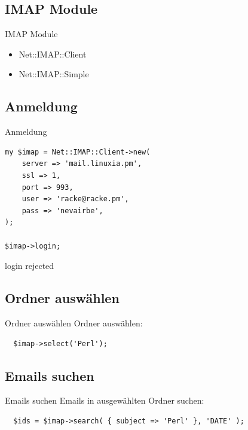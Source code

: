 \subsection{IMAP Module}

\begin{frame}{IMAP Module}
  \begin{itemize}
  \item Net::IMAP::Client
  \item Net::IMAP::Simple
  \end{itemize}
\end{frame}

\subsection{Anmeldung}

\begin{frame}[fragile]{Anmeldung}
\begin{verbatim}
my $imap = Net::IMAP::Client->new(
    server => 'mail.linuxia.pm',
    ssl => 1,
    port => 993,
    user => 'racke@racke.pm',
    pass => 'nevairbe',
);

$imap->login;
\end{verbatim}
\end{frame}

login rejected

\subsection{Ordner auswählen}

\begin{frame}[fragile]{Ordner auswählen}
  Ordner auswählen:

\begin{verbatim}
  $imap->select('Perl');
\end{verbatim}
\end{frame}

\subsection{Emails suchen}

\begin{frame}[fragile]{Emails suchen}
  Emails in ausgewählten Ordner suchen:

\begin{verbatim}
  $ids = $imap->search( { subject => 'Perl' }, 'DATE' );
\end{verbatim}
\end{frame}

